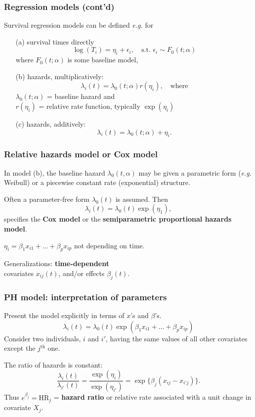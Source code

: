 \documentclass[12pt]{beamer}
\begin{document}
\begin{frame}
\frametitle{Regression models (cont'd)}
Survival regression models can be defined \textit{e.g.} for 
\begin{itemize}
\item[(a)] survival times directly 
$$ \log(T_i) = \eta_i + \epsilon_i, \quad\text{s.t. } 
\epsilon_i \sim F_0(t; \alpha)$$ 
where $F_0(t; \alpha)$ is some baseline model, 
\medskip
\item[(b)] hazards, multiplicatively: $$ 
\lambda_i(t) = \lambda_0(t; \alpha) r(\eta_i), \quad\text{where}$$
$\lambda_0(t; \alpha)$ = baseline hazard and \\
$r(\eta_i)$ = relative rate function, typically $\exp(\eta_i)$
\medskip
\item[(c)] hazards, additively: 
$$ \lambda_i(t) = \lambda_0(t; \alpha) + \eta_i. $$
\end{itemize}
\end{frame}




\begin{frame}
\frametitle{Relative hazards model or Cox model}

In model (b), the baseline hazard $\lambda_0(t,\alpha)$ may be given a parametric form (\textit{e.g.} Weibull) or
a piecewise constant rate (exponential) structure.

\bigskip
Often a parameter-free form $\lambda_0(t)$ is assumed. Then
\[
  \lambda_i(t) = \lambda_0(t) \exp(\eta_1),
\]
specifies the \textbf{Cox model} or the \textbf{semiparametric proportional hazards model}.

\bigskip
$\eta_i = \beta_1 x_{i1} + \dots + \beta_p x_{ip}$ not depending on time.  

\bigskip
Generalizations: \textbf{time-dependent} \\ covariates $x_{ij}(t)$, and/or 
effects $\beta_j(t)$.



\end{frame}

\begin{frame}
\frametitle{PH model: interpretation of parameters}

Present the model explicitly in terms of $x$'s and $\beta$'s.
\[
\lambda_i(t) = \lambda_0(t)  \exp({\beta_1 x_{i1} + \dots +
\beta_p x_{ip}})
\]
Consider two individuals, $i$ and $i'$, having the same values of all
other covariates except the $j^{\text{th}}$ one.

\bigskip
The ratio of hazards is constant:
$$  \frac{\lambda_i(t)}{\lambda_{i'}(t)} = \frac{\exp( \eta_{i}) }{\exp(\eta_{i'})}
= \exp \{ \beta_j(x_{ij}-x_{i'j}) \} . $$
Thus $e^{\beta_j} = \text{HR}_j$ = \textbf{hazard ratio} or relative rate
 associated with
 a unit change in covariate $X_j$.

\end{frame}
\end{document}
